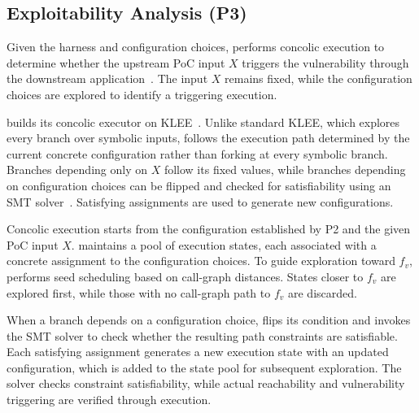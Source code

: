 

\subsection{Exploitability Analysis (P3)}\label{subsec:p3}
Given the harness and configuration choices, \sys performs concolic execution to determine whether the upstream PoC input $X$ triggers the vulnerability through the downstream application~\cite{majumdar2007hybrid}.
The input $X$ remains fixed, while the configuration choices are explored to identify a triggering execution.
%

\sys builds its concolic executor on KLEE~\cite{cadar2008klee}.
Unlike standard KLEE, which explores every branch over symbolic inputs, \sys follows the execution path determined by the current concrete configuration rather than forking at every symbolic branch.
%
Branches depending only on $X$ follow its fixed values, while branches depending on configuration choices can be flipped and checked for satisfiability using an SMT solver~\cite{de2008z3}.
Satisfying assignments are used to generate new configurations. 

Concolic execution starts from the configuration established by P2 and the given PoC input $X$.
\sys maintains a pool of execution states, each associated with a concrete assignment to the configuration choices.
%
To guide exploration toward $f_v$, \sys performs seed scheduling based on call-graph distances.
States closer to $f_v$ are explored first, while those with no call-graph path to $f_v$ are discarded.

When a branch depends on a configuration choice, \sys flips its condition and invokes the SMT solver to check whether the resulting path constraints are satisfiable.
Each satisfying assignment generates a new execution state with an updated configuration, which is added to the state pool for subsequent exploration.
The solver checks constraint satisfiability, while actual reachability and vulnerability triggering are verified through execution.

